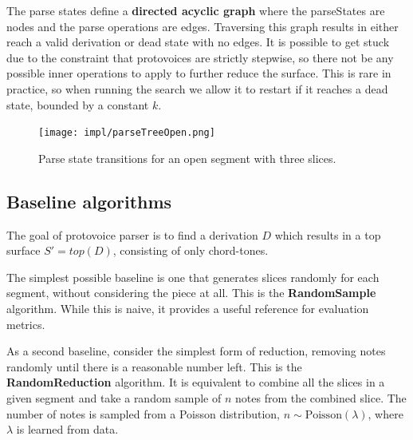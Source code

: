 \documentclass[12pt,a4paper,twoside,openright]{report}
\theoremstyle{definition}
\begin{document}
The parse states define a \textbf{directed acyclic graph} where the parseStates are nodes and the parse operations are edges. 
Traversing this graph results in either reach a valid derivation or dead state with no edges. It is possible to get stuck due to the constraint that protovoices are strictly stepwise, so there not be any possible inner operations to apply to further reduce the surface. 
This is rare in practice, so when running the search we allow it to restart if it reaches a dead state, bounded by a constant $k$.

\begin{figure}[h]
  \centering
  \texttt{[image: impl/parseTreeOpen.png]}
  \caption{Parse state transitions for an open segment with three slices.}
  \label{fig:statetrans}
\end{figure}



\subsection{Baseline algorithms}
The goal of protovoice parser is to find a derivation $D$ which results in a top surface $S' = top(D)$, consisting of only chord-tones. 

The simplest possible baseline is one that generates slices randomly for each segment, without considering the piece at all. This is the \textbf{RandomSample} algorithm. While this is naive, it provides a useful reference for evaluation metrics.

As a second baseline, consider the simplest form of reduction, removing notes randomly until there is a reasonable number left. This is the \textbf{RandomReduction} algorithm.
It is equivalent to combine all the slices in a given segment and take a random sample of $n$ notes from the combined slice. 
The number of notes is sampled from a Poisson distribution, $n \sim \text{Poisson}(\lambda)$, where $\lambda$ is learned from data. 
\end{document}
